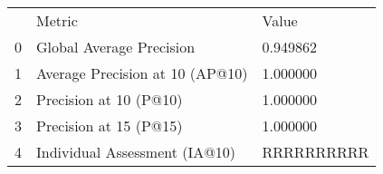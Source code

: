 \begin{tabular}{lll}
 & Metric & Value \\
0 & Global Average Precision & 0.949862 \\
1 & Average Precision at 10 (AP@10) & 1.000000 \\
2 & Precision at 10 (P@10) & 1.000000 \\
3 & Precision at 15 (P@15) & 1.000000 \\
4 & Individual Assessment (IA@10) & RRRRRRRRRR \\
\end{tabular}
